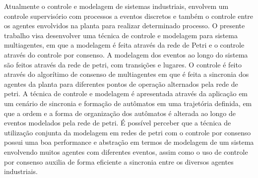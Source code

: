Atualmente o controle e modelagem de sistemas industriais, envolvem um controle supervisório com processos a eventos discretos e também o controle entre os agentes envolvidos na planta para realizar determinado processo.
O presente trabalho visa desenvolver uma técnica de controle e modelagem para sistema multiagentes, em que a modelagem é feita através da rede de Petri e o controle através do controle por consenso.
A modelagem dos eventos ao longo do sistema são feitos através da rede de petri, com transições e lugares. O controle é feito através do algorítimo de consenso de multiagentes em que é feita a sincronia dos agentes da planta para diferentes pontos de operação alternados pela rede de petri.
A técnica de controle e modelagem é apresentada através da aplicação em um cenário de sincronia e formação de autômatos em uma trajetória definida, em que a ordem e a forma de organização dos autômatos é alterada ao longo de eventos modelados pela rede de petri.
É possível perceber que a técnica de utilização conjunta da modelagem em redes de petri com o controle por consenso possui uma boa performance e abstração em termos de modelagem de um sistema envolvendo muitos agentes com diferentes eventos, assim como o uso de controle por consenso auxilia de forma eficiente a sincronia entre os diversos agentes industriais.



